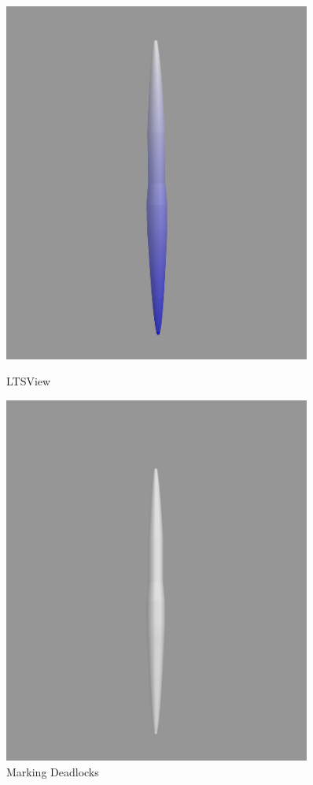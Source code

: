 \documentclass[a4paper,12pt]{article}
\begin{document}
\begin{figure}[ht]
    \centering
    \begin{minipage}{0.45\textwidth}
        \centering
        \includegraphics[width=0.9\textwidth]{3D-Model.png} \caption{LTSView}
        \label{fig:ltsview-1}
    \end{minipage}\hfill
    \begin{minipage}{0.45\textwidth}
        \centering
        \includegraphics[width=0.9\textwidth]{Deadlockfree.png} 
        \caption{Marking Deadlocks}
        \label{fig:deadlockfree}
    \end{minipage}
\end{figure}
\end{document}

